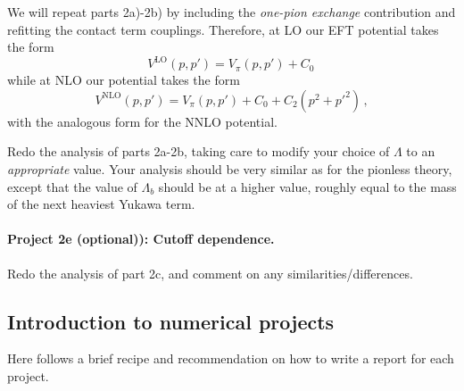 \documentclass[%
oneside,                 %
final,                   %
10pt]{article}
\begin{document}
We will repeat parts 2a)-2b) by including the \emph{one-pion exchange}
contribution and refitting the contact term couplings. Therefore, at
LO our EFT potential takes the form
\[
V^\mathrm{LO}(p,p')= V_{\pi}(p,p') + C_0\,
\]
while at NLO our potential takes the form
\[
V^\mathrm{NLO}(p,p')= V_{\pi}(p,p') + C_0 + C_2(p^2+p'^2)\,,
\]
with the analogous form for the NNLO potential. 

Redo the analysis of parts 2a-2b, taking care to modify your choice of
$\Lambda$ to an \emph{appropriate} value.  Your analysis should be very
similar as for the pionless theory, except that the value of
$\Lambda_b$ should be at a higher value, roughly equal to the mass of
the next heaviest Yukawa term.

\paragraph{Project 2e (optional)): Cutoff dependence.}
Redo the analysis of part 2c, and comment on any similarities/differences. 


\subsection*{Introduction to numerical projects}

Here follows a brief recipe and recommendation on how to write a report for each
project.
\end{document}
